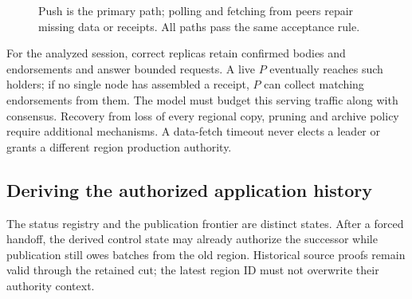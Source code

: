\documentclass[11pt,a4paper,onecolumn]{article}
\begin{document}
\begin{figure}[H]\centering

\caption{Push is the primary path; polling and fetching from peers repair
missing data or receipts. All paths pass the same acceptance rule.}
\label{fig:retrieval}
\end{figure}

For the analyzed session, correct replicas retain confirmed bodies and
endorsements and answer bounded requests. A live $P$ eventually reaches such
holders; if no single node has assembled a receipt, $P$ can collect matching
endorsements from them. The model must budget this serving traffic along with
consensus. Recovery from loss of every regional copy, pruning and archive
policy require additional mechanisms. A data-fetch timeout never elects a
leader or grants a different region production authority.

\subsection{Deriving the authorized application history}\label{sec:rollup}
The status registry and the publication frontier are distinct states.
After a forced handoff, the derived control state may already authorize the successor
while publication still owes batches from the old region. Historical
source proofs remain valid through the retained cut; the latest region ID
must not overwrite their authority context.
\end{document}
